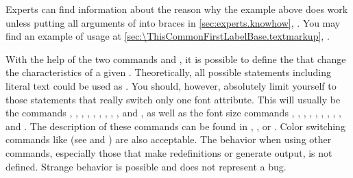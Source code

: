     \else %
      Experts can find information about the reason why the example above does
      work unless putting all arguments of  into braces in
      \autoref{sec:experts.knowhow},
      .%
    \fi
  \else
    You may find an example of usage at
    \autoref{sec:\ThisCommonFirstLabelBase.textmarkup},
    .
  \fi%
  \EndIndexGroup%
\fi


\begin{Declaration}
\end{Declaration}%
With the help of the two commands  and
, it is possible to define the  that
change the characteristics of a given . Theoretically, all
possible statements including literal text could be used as .
You should, however, absolutely limit yourself to those
statements that really switch only one font attribute. This will usually be
the commands , , ,
, , , ,
, , and , as well as the font
size commands , , , ,
, , , ,
, and . The description of these commands can be
found in \cite{lshort}, \cite{latex:usrguide}, or \cite{latex:fntguide}. Color
switching commands like  (see \cite{package:graphics} and
\cite{package:xcolor}) are also acceptable.  The behavior when using other
commands, especially those that make redefinitions or generate output, is not
defined. Strange behavior is possible and does not represent a bug.

